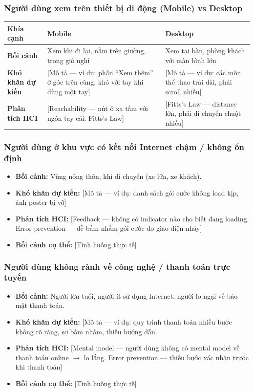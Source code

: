 \subsubsection{Người dùng xem trên thiết bị di động (Mobile) vs Desktop}

\begin{center}
\small
\begin{tabularx}{\textwidth}{|l|X|X|}
\hline
\textbf{Khía cạnh} & \textbf{Mobile} & \textbf{Desktop} \\
\hline
\textbf{Bối cảnh} & Xem khi đi lại, nằm trên giường, trong giờ nghỉ & Xem tại bàn, phòng khách với màn hình lớn \\
\hline
\textbf{Khó khăn dự kiến} & [Mô tả --- ví dụ: phần ``Xem thêm'' ở góc trên cùng, khó với tay khi dùng một tay] & [Mô tả --- ví dụ: các môn thể thao trải dài, phải scroll nhiều] \\
\hline
\textbf{Phân tích HCI} & [Reachability --- nút ở xa tầm với ngón tay cái. Fitts's Law] & [Fitts's Law --- distance lớn, phải di chuyển chuột nhiều] \\
\hline
\end{tabularx}
\end{center}

\subsubsection{Người dùng ở khu vực có kết nối Internet chậm / không ổn định}
\begin{itemize}[leftmargin=2em]
  \item \textbf{Bối cảnh:} Vùng nông thôn, khi di chuyển (xe lửa, xe khách).
  \item \textbf{Khó khăn dự kiến:} [Mô tả --- ví dụ: danh sách gói cước không load kịp, ảnh poster bị vỡ]
  \item \textbf{Phân tích HCI:} [Feedback --- không có indicator nào cho biết đang loading. Error prevention --- dễ bấm nhầm gói cước do giao diện nhảy]
  \item \textbf{Bối cảnh cụ thể:} [Tình huống thực tế]
\end{itemize}

\subsubsection{Người dùng không rành về công nghệ / thanh toán trực tuyến}
\begin{itemize}[leftmargin=2em]
  \item \textbf{Bối cảnh:} Người lớn tuổi, người ít sử dụng Internet, người lo ngại về bảo mật thanh toán.
  \item \textbf{Khó khăn dự kiến:} [Mô tả --- ví dụ: quy trình thanh toán nhiều bước không rõ ràng, sợ bấm nhầm, thiếu hướng dẫn]
  \item \textbf{Phân tích HCI:} [Mental model --- người dùng không có mental model về thanh toán online $\rightarrow$ lo lắng. Error prevention --- thiếu bước xác nhận trước khi thanh toán]
  \item \textbf{Bối cảnh cụ thể:} [Tình huống thực tế]
\end{itemize}

